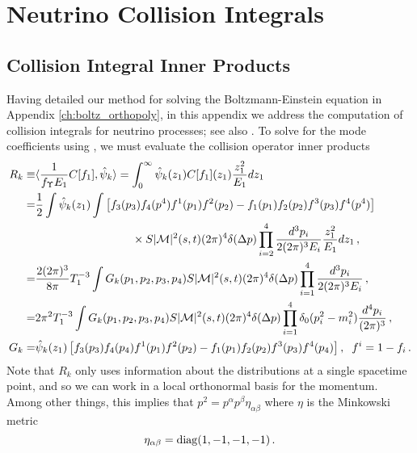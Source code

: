 
\section{Neutrino Collision Integrals}\label{ch:coll_simp}


\subsection{Collision Integral Inner Products}
Having detailed our method for solving the Boltzmann-Einstein equation in Appendix \ref{ch:boltz_orthopoly}, in this appendix we address the computation of  collision integrals for neutrino processes; see also \cite{Birrell:2014uka}. To solve for the mode coefficients using , we must evaluate the collision operator inner products
\begin{align}\label{collision_integrals}
R_k\equiv&\langle\frac{1}{f_\Upsilon E_1}C[f_1],\hat\psi_k\rangle=\int_0^\infty \hat\psi_k(z_1)C[f_1](z_1) \frac{z_1^2}{E_1}dz_1\\
=&\frac{1}{2}\int \hat\psi_k(z_1)\int\left[f_3(p_3)f_4(p^4)f^1(p_1)f^2(p_2)-f_1(p_1)f_2(p_2)f^3(p_3)f^4(p^4)\right]\notag\\
&\hspace{30mm}\times S |\mathcal{M}|^2(s,t)(2\pi)^4\delta(\Delta p)\prod_{i=2}^4\frac{d^{3}p_i}{2(2\pi)^3E_i}\frac{z_1^2}{E_1}dz_1\,,\notag\\
=&\frac{2(2\pi)^3}{8\pi}T_1^{-3}\int G_k(p_1,p_2,p_3,p_4)S |\mathcal{M}|^2(s,t)(2\pi)^4\delta(\Delta p)\prod_{i=1}^4\frac{d^{3}p_i}{2(2\pi)^3E_i}\,,\notag\\
=&2\pi^2T_1^{-3}\int G_k(p_1,p_2,p_3,p_4)S |\mathcal{M}|^2(s,t)(2\pi)^4\delta(\Delta p)\prod_{i=1}^4 \delta_0(p_i^2-m_i^2)\frac{d^4p_i}{(2\pi)^3}\,,\notag\\
G_k=&\hat\psi_k(z_1)\left[f_3(p_3)f_4(p_4)f^1(p_1)f^2(p_2)-f_1(p_1)f_2(p_2)f^3(p_3)f^4(p_4)\right],\hspace{2mm} f^i=1- f_i\,.\notag
\end{align}
Note that $R_k$ only uses information about the distributions at a single spacetime point, and so we can work in a local orthonormal basis for the momentum.  Among other things, this implies that $p^2=p^\alpha p^\beta\eta_{\alpha\beta}$ where $\eta$ is the Minkowski metric
\begin{equation}
\eta_{\alpha\beta}=\mathrm{diag}(1,-1,-1,-1)\,.
\end{equation}

